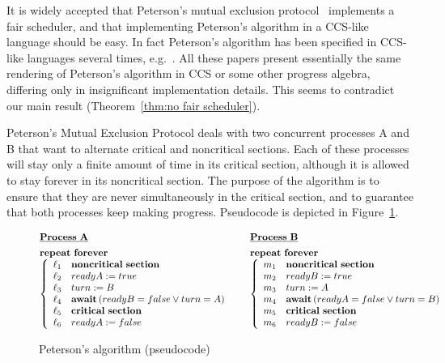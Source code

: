 \documentclass[smallcondensed]{svjour3}
\newcommand{\Fig}[1]{Figure~\ref{fig:#1}}
\begin{document}
It is widely accepted that Peterson's mutual exclusion protocol~\cite{Peterson81} implements a fair
scheduler, and that implementing Peterson's algorithm in a CCS-like language should be easy.
In fact Peterson's algorithm has been specified in CCS-like languages several times, e.g.\
\cite{Walker89,Bouali91,Valmari96,AcetoEtAl07}.   All these papers present essentially the same rendering of Peterson's algorithm
in CCS or some other progress algebra, differing only in insignificant implementation details.
This seems to contradict our main result (Theorem~\ref{thm:no fair scheduler}).
\newcommand{\procA}{{\rm A}\xspace}
\newcommand{\procB}{{\rm B}\xspace}

Peterson's Mutual Exclusion Protocol deals with two concurrent processes \procA and \procB that want to
alternate critical and noncritical sections. Each of these processes
will stay only a finite amount of time in its critical section,
although it is allowed to stay forever in its noncritical section.
The purpose of the algorithm is to ensure that they are never
simultaneously in the critical section, and to guarantee that both
processes keep making progress. 
Pseudocode is depicted in \Fig{peterson}.

\begin{figure}
\[
\begin{array}{@{}l@{}}
\underline{\bf Process~A}\\[1ex]
{\bf repeat~forever}\\
\left\{\begin{array}{ll}
\ell_1 & {\bf noncritical~section}\\
\ell_2 & readyA := true	\\
\ell_3 & turn := B \\
\ell_4 & {\bf await}\,(readyB = false \vee turn = A) \\
\ell_5 & {\bf critical~section}\\
\ell_6 & readyA := false \\
\end{array}\right.
\end{array}
~~~~~~
\begin{array}{@{}l@{}}
\underline{\bf Process~B}\\[1ex]
{\bf repeat~forever}\\
\left\{\begin{array}{ll}
m_1 & {\bf noncritical~section}\\
m_2 & readyB := true	\\
m_3 & turn := A \\
m_4 & {\bf await}\,(readyA = false \vee turn = B) \\
m_5 & {\bf critical~section}\\
m_6 & readyB := false \\
\end{array}\right.
\end{array}
\]
\caption{Peterson's algorithm (pseudocode)}
\label{fig:peterson}
\end{figure}
\end{document}
